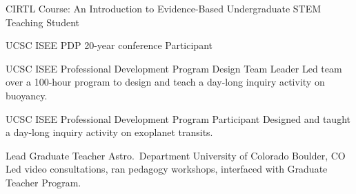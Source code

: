         {CIRTL Course: An Introduction to Evidence-Based Undergraduate STEM Teaching}
        {Student}
        {}{}{}

\cventry{}
        {UCSC ISEE PDP 20-year conference}
        {Participant}
        {}{}{}

		{UCSC ISEE Professional Development Program}
		{Design Team Leader}
		{}
		{}
		{Led team over a 100-hour program to design and teach a day-long inquiry activity on buoyancy.}

		{UCSC ISEE Professional Development Program}
		{Participant}
		{}
		{}
		{Designed and taught a day-long inquiry activity on exoplanet transits.}

		{Lead Graduate Teacher}
		{Astro.~Department}
		{University of Colorado}
		{Boulder, CO}
		{Led video consultations, ran pedagogy workshops, interfaced with Graduate Teacher Program.}


